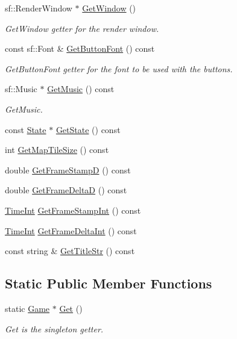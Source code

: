 \begin{DoxyCompactItemize}
sf\-::\-Render\-Window $\ast$ \hyperlink{class_game_a14241d779a3aa1dd9f4bb68cd018bbe8}{Get\-Window} ()
\begin{DoxyCompactList}\small\item\em Get\-Window getter for the render window. \end{DoxyCompactList}\item 
const sf\-::\-Font \& \hyperlink{class_game_ac508be317e5c3a7d7c41df0f9c740a96}{Get\-Button\-Font} () const 
\begin{DoxyCompactList}\small\item\em Get\-Button\-Font getter for the font to be used with the buttons. \end{DoxyCompactList}\item 
sf\-::\-Music $\ast$ \hyperlink{class_game_a156aeef24e86a468033121036fed239c}{Get\-Music} () const 
\begin{DoxyCompactList}\small\item\em Get\-Music. \end{DoxyCompactList}\item 
const \hyperlink{class_state}{State} $\ast$ \hyperlink{class_game_affa409c844370f25a5419a1f5225b0b5}{Get\-State} () const 
\item 
int \hyperlink{class_game_aa5913044e335b5624f52d6c95deed081}{Get\-Map\-Tile\-Size} () const 
\item 
double \hyperlink{class_game_a1a3becd8fb845889b4a2a86a32397393}{Get\-Frame\-Stamp\-D} () const 
\item 
double \hyperlink{class_game_a85bcfed7671cd09b10f3ea3c1c7a52db}{Get\-Frame\-Delta\-D} () const 
\item 
\hyperlink{_game_8hpp_a332b72dfb4bc8b4c16b8dc43864fe343}{Time\-Int} \hyperlink{class_game_aa7cf915c5e5f3a4b57b28eba915cfe2c}{Get\-Frame\-Stamp\-Int} () const 
\item 
\hyperlink{_game_8hpp_a332b72dfb4bc8b4c16b8dc43864fe343}{Time\-Int} \hyperlink{class_game_a60b3e0977db00a1c6c6ead044c7b1f27}{Get\-Frame\-Delta\-Int} () const 
\item 
const string \& \hyperlink{class_game_ad4eddde638de70fbbcdc212375fd7342}{Get\-Title\-Str} () const 
\end{DoxyCompactItemize}
\subsection*{Static Public Member Functions}
\begin{DoxyCompactItemize}
\item 
static \hyperlink{class_game}{Game} $\ast$ \hyperlink{class_game_a700c0cde9d2a8c5ad2672a8fdc0cfb4a}{Get} ()
\begin{DoxyCompactList}\small\item\em Get is the singleton getter. \end{DoxyCompactList}\end{DoxyCompactItemize}


